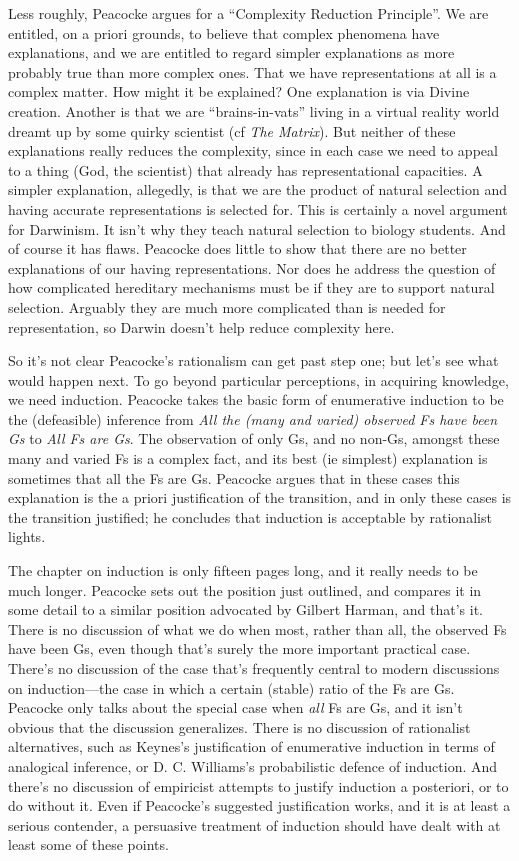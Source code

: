 \documentclass[
  11pt,
  letterpaper,
  DIV=11,
  numbers=noendperiod,
  twoside]{scrartcl}
\begin{document}
Less roughly, Peacocke argues for a ``Complexity Reduction Principle''.
We are entitled, on a priori grounds, to believe that complex phenomena
have explanations, and we are entitled to regard simpler explanations as
more probably true than more complex ones. That we have representations
at all is a complex matter. How might it be explained? One explanation
is via Divine creation. Another is that we are ``brains-in-vats'' living
in a virtual reality world dreamt up by some quirky scientist (cf
\emph{The Matrix}). But neither of these explanations really reduces the
complexity, since in each case we need to appeal to a thing (God, the
scientist) that already has representational capacities. A simpler
explanation, allegedly, is that we are the product of natural selection
and having accurate representations is selected for. This is certainly a
novel argument for Darwinism. It isn't why they teach natural selection
to biology students. And of course it has flaws. Peacocke does little to
show that there are no better explanations of our having
representations. Nor does he address the question of how complicated
hereditary mechanisms must be if they are to support natural selection.
Arguably they are much more complicated than is needed for
representation, so Darwin doesn't help reduce complexity here.

So it's not clear Peacocke's rationalism can get past step one; but
let's see what would happen next. To go beyond particular perceptions,
in acquiring knowledge, we need induction. Peacocke takes the basic form
of enumerative induction to be the (defeasible) inference from \emph{All
the (many and varied) observed Fs have been Gs} to \emph{All Fs are Gs}.
The observation of only Gs, and no non-Gs, amongst these many and varied
Fs is a complex fact, and its best (ie simplest) explanation is
sometimes that all the Fs are Gs. Peacocke argues that in these cases
this explanation is the a priori justification of the transition, and in
only these cases is the transition justified; he concludes that
induction is acceptable by rationalist lights.

The chapter on induction is only fifteen pages long, and it really needs
to be much longer. Peacocke sets out the position just outlined, and
compares it in some detail to a similar position advocated by Gilbert
Harman, and that's it. There is no discussion of what we do when most,
rather than all, the observed Fs have been Gs, even though that's surely
the more important practical case. There's no discussion of the case
that's frequently central to modern discussions on induction---the case
in which a certain (stable) ratio of the Fs are Gs. Peacocke only talks
about the special case when \emph{all} Fs are Gs, and it isn't obvious
that the discussion generalizes. There is no discussion of rationalist
alternatives, such as Keynes's justification of enumerative induction in
terms of analogical inference, or D. C. Williams's probabilistic defence
of induction. And there's no discussion of empiricist attempts to
justify induction a posteriori, or to do without it. Even if Peacocke's
suggested justification works, and it is at least a serious contender, a
persuasive treatment of induction should have dealt with at least some
of these points.
\end{document}
